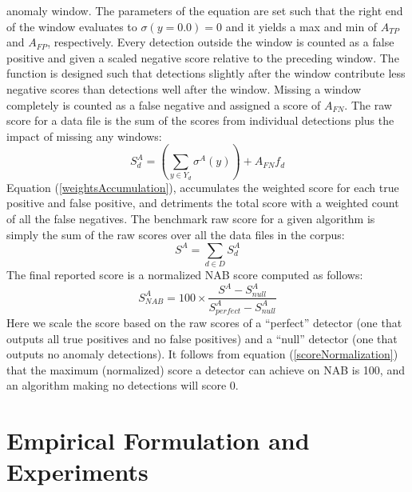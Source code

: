 \documentclass[12pt]{article}
\begin{document}
anomaly window. The parameters of the equation are set such that
the right end of the window evaluates to $\sigma(y = 0.0) = 0$ and it yields a max and min of $A_{TP}$ and $A_{FP}$, respectively. Every detection outside the window is counted as
a false positive and given a scaled negative score relative to the
preceding window. The function is designed such that
detections slightly after the window contribute less negative
scores than detections well after the window. Missing a
window completely is counted as a false negative and assigned
a score of $A_{FN}$. The raw score for a data file is the sum of the scores from
individual detections plus the impact of missing any windows:
\begin{equation}
S^A_d = (\sum_{y \in Y_d} \sigma^A(y)) + A_{FN}f_d
\label{weightsAccumulation}
\end{equation}
Equation (\ref{weightsAccumulation}), accumulates the weighted score for each true positive
and false positive, and detriments the total score with a
weighted count of all the false negatives. The benchmark raw score for a given algorithm is simply the sum of the raw scores
over all the data files in the corpus:
\begin{equation}
S^A = \sum_{d \in D} S^A_d
\label{allScore}
\end{equation}
The final reported score is a normalized NAB score computed as follows:
\begin{equation}
S^A_{NAB} = 100 \times \frac{S^A - S^A_{null}}{S^A_{perfect} - S^A_{null}}
\label{scoreNormalization}
\end{equation}
Here we scale the score based on the raw scores of a “perfect”
detector (one that outputs all true positives and no false
positives) and a “null” detector (one that outputs no anomaly
detections). It follows from equation (\ref{scoreNormalization}) that the maximum (normalized) score a detector can achieve on NAB is 100, and an algorithm making no detections will score 0.

\section{Empirical Formulation and Experiments}
\end{document}
